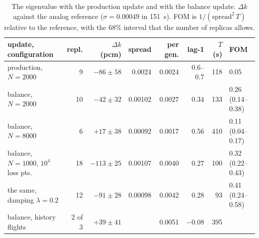 \begin{table}[t]\centering\small
\caption{The eigenvalue with the production update and with the balance update. $\Delta k$ against
the analog reference ($\sigma=0.00049$ in 151~s). FOM is $1/(\text{spread}^2\,T)$ relative to the
reference, with the 68\% interval that the number of replicas allows.}\label{tab:res:balance}
\setlength{\tabcolsep}{4pt}\footnotesize
\begin{tabular}{@{}lrrrrrrl@{}}
\toprule
update, configuration & repl. & $\Delta k$ (pcm) & spread & per gen. & lag-1 & $T$ (s) & FOM\\
\midrule
production, $N=2000$ & 9 & $-86\pm58$ & 0.0024 & 0.0024 & 0.6--0.7 & 118 & 0.05\\
balance, $N=2000$ & 10 & $-42\pm32$ & 0.00102 & 0.0027 & 0.34 & 133 & 0.26 (0.14--0.38)\\
balance, $N=8000$ & 6 & $+17\pm38$ & 0.00092 & 0.0017 & 0.56 & 410 & 0.11 (0.04--0.17)\\
balance, $N=1000$, $10^4$ loss pts. & 18 & $-113\pm25$ & 0.00107 & 0.0040 & 0.27 & 100 & 0.32 (0.22--0.43)\\
the same, damping $\lambda=0.2$ & 12 & $-91\pm28$ & 0.00098 & 0.0042 & 0.28 & 93 & 0.41 (0.24--0.58)\\
balance, history flights & 2 of 3 & $+39\pm41$ & & 0.0051 & $-0.08$ & 395 & \\
\bottomrule
\end{tabular}
\end{table}

